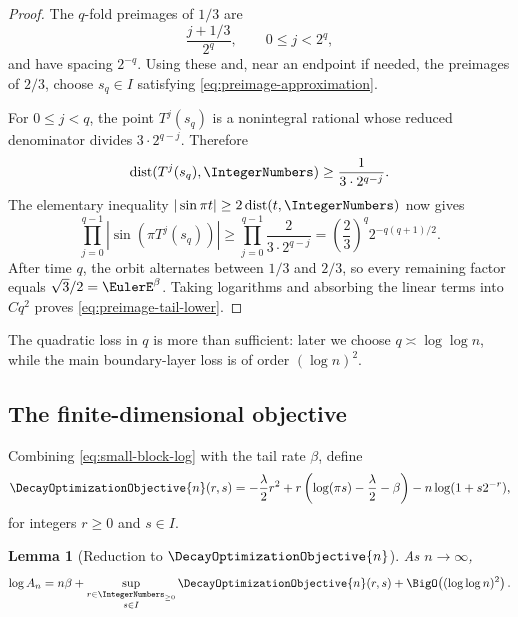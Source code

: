\documentclass[11pt,oneside]{article}
\newtheorem{lemma}[lemma]{Lemma}
\theoremstyle{definition}
\theoremstyle{remark}
\newcommand{\dist}{\operatorname{dist}}
\begin{document}
\begin{proof}
The \(q\)-fold preimages of \(1/3\) are
\[
 \frac{j+1/3}{2^q},
 \qquad 0\le j<2^q,
\]
and have spacing \(2^{-q}\).  Using these and, near an endpoint if needed,
the preimages of \(2/3\), choose \(s_q\in I\) satisfying
\eqref{eq:preimage-approximation}.

For \(0\le j<q\), the point \(T^j(s_q)\) is a nonintegral rational whose
reduced denominator divides \(3\cdot2^{q-j}\).  Therefore
\[
 \dist(T^j(s_q),\IntegerNumbers)\ge\frac{1}{3\cdot2^{q-j}}.
\]
The elementary inequality
\(
 |\sin\pi t|\ge2\dist(t,\IntegerNumbers)
\)
now gives
\[
 \prod_{j=0}^{q-1}|\sin(\pi T^j(s_q))|
 \ge\prod_{j=0}^{q-1}\frac{2}{3\cdot2^{q-j}}
 =\left(\frac23\right)^q2^{-q(q+1)/2}.
\]
After time \(q\), the orbit alternates between \(1/3\) and \(2/3\), so every
remaining factor equals \(\sqrt3/2=\EulerE^\beta\).  Taking logarithms and
absorbing the linear terms into \(Cq^2\) proves
\eqref{eq:preimage-tail-lower}.
\end{proof}

The quadratic loss in \(q\) is more than sufficient: later we choose
\(q\asymp\log\log n\), while the main boundary-layer loss is of order
\((\log n)^2\).

\subsection{The finite-dimensional objective}

Combining \eqref{eq:small-block-log} with the tail rate \(\beta\), define
\begin{equation}
 \DecayOptimizationObjective{n}(r,s)=
 -\frac{\lambda}{2}r^2
 +r\left(\log(\pi s)-\frac\lambda2-\beta\right)
 -n\log(1+s2^{-r}),
 \label{eq:Fn-exact}
\end{equation}
for integers \(r\ge0\) and \(s\in I\).

\begin{lemma}[Reduction to \(\DecayOptimizationObjective{n}\)]
\label{lem:An-Fn-reduction}
As \(n\to\infty\),
\begin{equation}
 \log A_n
 =n\beta+
 \sup_{\substack{r\in\IntegerNumbers_{\ge0}\\s\in I}}
 \DecayOptimizationObjective{n}(r,s)
 +\BigO\!\left((\log\log n)^2\right).
 \label{eq:An-Fn-reduction}
\end{equation}
\end{lemma}
\end{document}
